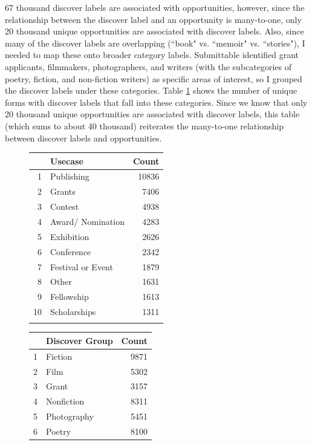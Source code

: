 \documentclass[]{report}   %
\begin{document}
67 thousand discover labels are associated with opportunities, however, since the relationship between the discover label and an opportunity is many-to-one, only 20 thousand unique opportunities are associated with discover labels. Also, since many of the discover labels are overlapping (``book" vs. ``memoir" vs. ``stories"), I needed to map these onto broader category labels. Submittable identified grant applicants, filmmakers, photographers, and writers (with the subcategories of poetry, fiction, and non-fiction writers) as specific areas of interest, so I grouped the discover labels under these categories. Table \ref{table:discovergroup} shows the number of unique forms with discover labels that fall into these categories. Since we know that only 20 thousand unique opportunities are associated with discover labels, this table (which sums to about 40 thousand) reiterates the many-to-one relationship between discover labels and opportunities.
\begin{figure}[t]
\begin{minipage}[t]{0.45\textwidth}
\captionsetup{font=scriptsize}
\centering
{}
\label{table:topusecase}
\begin{tabular}[t]{rlr}
  \hline
 & Usecase & Count \\ 
  \hline
1 & Publishing & 10836 \\ 
  2 & Grants & 7406 \\ 
  3 & Contest & 4938 \\ 
  4 & Award/ Nomination & 4283 \\ 
  5 & Exhibition & 2626 \\ 
  6 & Conference & 2342 \\ 
  7 & Festival or Event & 1879 \\ 
  8 & Other & 1631 \\ 
  9 & Fellowship & 1613 \\ 
  10 & Scholarships & 1311 \\ 
   \hline
\vspace{20cm}
\end{tabular}
\end{minipage}
\hfill
\begin{minipage}[t]{0.45\textwidth}
\captionsetup{font=scriptsize}
     \centering
{}
\label{table:discovergroup}
\centering
\begin{tabular}[t]{rlr}
  \hline
 & Discover Group & Count \\ 
  \hline
1 & Fiction & 9871 \\ 
  2 & Film & 5302 \\ 
  3 & Grant & 3157 \\ 
  4 & Nonfiction & 8311 \\ 
  5 & Photography & 5451 \\ 
  6 & Poetry & 8100 \\ 
   \hline
\end{tabular}
    \end{minipage}
\end{figure}
\end{document}
